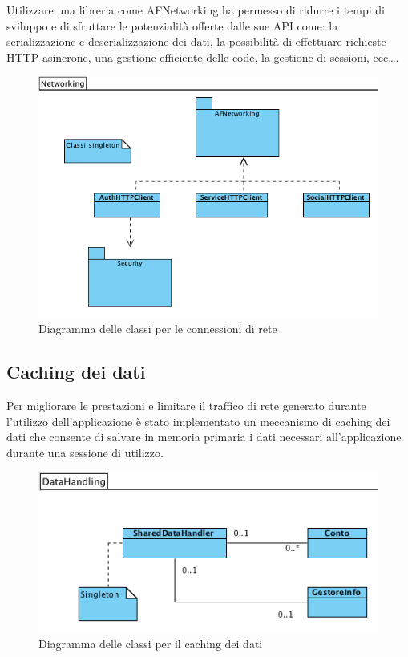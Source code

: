 Utilizzare una libreria come AFNetworking ha permesso di ridurre i tempi di sviluppo e di sfruttare le potenzialità offerte dalle sue API come: la serializzazione e deserializzazione dei dati, la possibilità di effettuare richieste HTTP asincrone, una gestione efficiente delle code, la gestione di sessioni, ecc\dots.  

\begin{figure}[!htbp]
\centering
\includegraphics[scale=0.70]{architettura/networkingClass.png}
\caption{Diagramma delle classi per le connessioni di rete}
\end{figure}


\subsection{Caching dei dati}
Per migliorare le prestazioni e limitare il traffico di rete generato durante l'utilizzo dell'applicazione è stato implementato un meccanismo di caching dei dati che consente di salvare in memoria primaria i dati necessari all'applicazione durante una sessione di utilizzo. 

\begin{figure}[!htbp]
\centering
\includegraphics[scale=0.70]{architettura/cacheClass.png}
\caption{Diagramma delle classi per il caching dei dati}
\end{figure}

